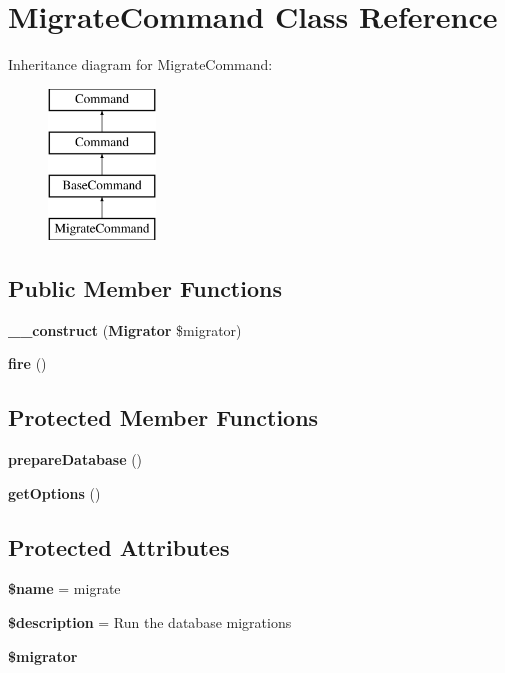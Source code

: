 \section{Migrate\+Command Class Reference}
\label{class_illuminate_1_1_database_1_1_console_1_1_migrations_1_1_migrate_command}
Inheritance diagram for Migrate\+Command\+:\begin{figure}[H]
\begin{center}
\leavevmode
\includegraphics[height=4.000000cm]{class_illuminate_1_1_database_1_1_console_1_1_migrations_1_1_migrate_command}
\end{center}
\end{figure}
\subsection*{Public Member Functions}
\begin{DoxyCompactItemize}
\item 
{\bf \+\_\+\+\_\+construct} ({\bf Migrator} \$migrator)
\item 
{\bf fire} ()
\end{DoxyCompactItemize}
\subsection*{Protected Member Functions}
\begin{DoxyCompactItemize}
\item 
{\bf prepare\+Database} ()
\item 
{\bf get\+Options} ()
\end{DoxyCompactItemize}
\subsection*{Protected Attributes}
\begin{DoxyCompactItemize}
\item 
{\bf \$name} = \textquotesingle{}migrate\textquotesingle{}
\item 
{\bf \$description} = \textquotesingle{}Run the database migrations\textquotesingle{}
\item 
{\bf \$migrator}
\end{DoxyCompactItemize}



